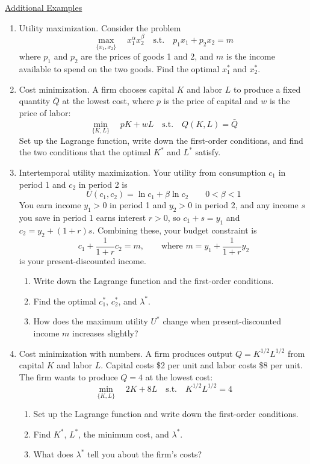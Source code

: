 \underline{Additional Examples}
\begin{enumerate}
\item[1.] Utility maximization. Consider the problem
\[\max_{\{x_1, x_2\}} \quad x_1^{\alpha} x_2^{\beta} \quad \text{s.t.} \quad p_1 x_1 + p_2 x_2 = m\]
where $p_1$ and $p_2$ are the prices of goods 1 and 2, and $m$ is the income available to spend on the two goods. Find the optimal $x_1^*$ and $x_2^*$.

\item[2.] Cost minimization. A firm chooses capital $K$ and labor $L$ to produce a fixed quantity $\bar{Q}$ at the lowest cost, where $p$ is the price of capital and $w$ is the price of labor:
\[\min_{\{K, L\}} \quad pK + wL \quad \text{s.t.} \quad Q(K, L) = \bar{Q}\]
Set up the Lagrange function, write down the first-order conditions, and find the two conditions that the optimal $K^*$ and $L^*$ satisfy.

\item[3.] Intertemporal utility maximization. Your utility from consumption $c_1$ in period 1 and $c_2$ in period 2 is
\[U(c_1, c_2) = \ln c_1 + \beta \ln c_2 \qquad 0 < \beta < 1\]
You earn income $y_1 > 0$ in period 1 and $y_2 > 0$ in period 2, and any income $s$ you save in period 1 earns interest $r > 0$, so $c_1 + s = y_1$ and $c_2 = y_2 + (1 + r)s$. Combining these, your budget constraint is
\[c_1 + \frac{1}{1+r} c_2 = m, \qquad \text{where } m = y_1 + \frac{1}{1+r} y_2\]
is your present-discounted income.
\begin{enumerate}
\item[(a)] Write down the Lagrange function and the first-order conditions.
\item[(b)] Find the optimal $c_1^*$, $c_2^*$, and $\lambda^*$.
\item[(c)] How does the maximum utility $U^*$ change when present-discounted income $m$ increases slightly?
\end{enumerate}

\item[4.] Cost minimization with numbers. A firm produces output $Q = K^{1/2} L^{1/2}$ from capital $K$ and labor $L$. Capital costs \$2 per unit and labor costs \$8 per unit. The firm wants to produce $Q = 4$ at the lowest cost:
\[\min_{\{K, L\}} \quad 2K + 8L \quad \text{s.t.} \quad K^{1/2} L^{1/2} = 4\]
\begin{enumerate}
\item[(a)] Set up the Lagrange function and write down the first-order conditions.
\item[(b)] Find $K^*$, $L^*$, the minimum cost, and $\lambda^*$.
\item[(c)] What does $\lambda^*$ tell you about the firm's costs?
\end{enumerate}


\end{enumerate}
